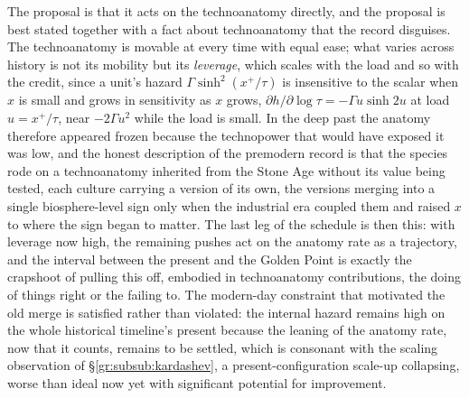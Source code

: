 The proposal is that it acts on the technoanatomy
directly, and the proposal is best stated together with a fact
about technoanatomy that the record disguises. The technoanatomy is
movable at every time with equal ease; what varies across history is
not its mobility but its \emph{leverage}, which scales with the load and
so with the credit, since a unit's hazard $\Gamma\sinh^2(x^+/\tau)$ is
insensitive to the scalar when $x$ is small and grows in sensitivity as
$x$ grows, $\partial h/\partial\log\tau=-\Gamma u\sinh2u$ at load $u=x^+/\tau$,
near $-2\Gamma u^2$ while the load is small. In the deep past
the anatomy therefore appeared frozen because the technopower that
would have exposed it was low, and the honest description of the
premodern record is that the species rode on a technoanatomy
inherited from the Stone Age without its value being tested, each
culture carrying a version of its own, the versions merging into a
single biosphere-level sign only when the industrial era coupled
them and raised $x$ to where the sign began to matter. The last leg
of the schedule is then this: with leverage now high, the remaining
pushes act on the anatomy rate as a trajectory, and the interval between the
present and the Golden Point is exactly the crapshoot of pulling
this off, embodied in technoanatomy contributions, the doing of
things right or the failing to. The modern-day constraint that
motivated the old merge is satisfied rather than violated: the
internal hazard remains high on the whole historical timeline's
present because the leaning of the anatomy rate, now that it counts, remains
to be settled, which is consonant with the scaling observation of
\S\ref{gr:subsub:kardashev}, a present-configuration scale-up
collapsing, worse than ideal now yet with significant potential for
improvement.

